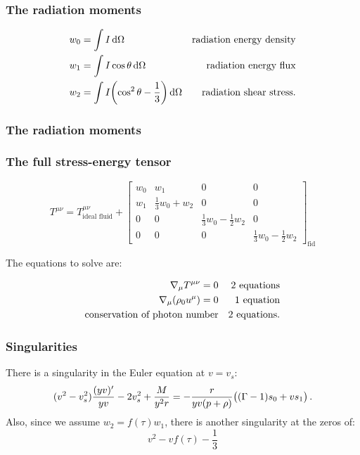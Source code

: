 \documentclass{beamer}
\begin{document}
\begin{frame}
    \frametitle{The radiation moments}

    \begin{subequations}
    \begin{align*}
      w_0 &= \int I \dd{\Omega} & \text{radiation energy density} \\
      w_1 &= \int I \cos \theta \dd{\Omega} & \text{radiation energy flux} \\
      w_2 &= \int I \qty(\cos^2 \theta - \frac{1}{3}) \dd{\Omega} & \text{radiation shear stress.}
    \end{align*}
    \end{subequations}
\end{frame}

\begin{frame}
    \frametitle{The radiation moments}

\end{frame}

\begin{frame}
    \frametitle{The full stress-energy tensor}

    \begin{equation*}
    T^{\mu\nu} =
    T^{\mu\nu}_{\text{ideal fluid}} +
    \begin{bmatrix}
    w_0   & w_1  & 0  & 0 \\
    w_1   & \frac{1}{3}w_0 + w_2  &  0  & 0 \\
      0 & 0  &  \frac{1}{3}w_0 -\frac{1}{2}w_2 & 0 \\
      0 & 0  &  0 & \frac{1}{3}w_0 -\frac{1}{2}w_2
    \end{bmatrix} _{\text{fid}}
    \end{equation*}

    The equations to solve are:

    \begin{subequations}
    \begin{align*}
      \nabla_\mu T^{\mu\nu} = 0 && \text{2 equations} \\
      \nabla_\mu \qty(\rho_0 u^\mu) = 0&& \text{1 equation} \\
      \text{conservation of photon number} && \text{2 equations.}
    \end{align*}
    \end{subequations}
\end{frame}

\begin{frame}
    \frametitle{Singularities}
    There is a singularity in the Euler equation at \(v = v_s\):
        \begin{equation*}
        (v^2 - v_s^2) \frac{(yv) ^{\prime}}{yv} - 2 v_s^2 + \frac{M}{y^2 r}
        = -\frac{r}{yv (p + \rho)} \qty((\Gamma-1)s_0 + v s_1)\,.
        \end{equation*}
    Also, since we assume \(w_2 = f(\tau) w_1\), there is another singularity at the zeros of:
    \begin{equation*}
        v^2 - v f(\tau) - \frac{1}{3}
    \end{equation*}
\end{frame}
\end{document}
